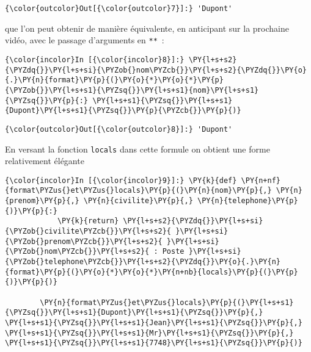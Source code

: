 \begin{Verbatim}[commandchars=\\\{\}]
{\color{outcolor}Out[{\color{outcolor}7}]:} 'Dupont'
\end{Verbatim}
            
    que l'on peut obtenir de manière équivalente, en anticipant sur la
prochaine vidéo, avec le passage d'arguments en \texttt{**}~:

    \begin{Verbatim}[commandchars=\\\{\}]
{\color{incolor}In [{\color{incolor}8}]:} \PY{l+s+s2}{\PYZdq{}}\PY{l+s+si}{\PYZob{}nom\PYZcb{}}\PY{l+s+s2}{\PYZdq{}}\PY{o}{.}\PY{n}{format}\PY{p}{(}\PY{o}{*}\PY{o}{*}\PY{p}{\PYZob{}}\PY{l+s+s1}{\PYZsq{}}\PY{l+s+s1}{nom}\PY{l+s+s1}{\PYZsq{}}\PY{p}{:} \PY{l+s+s1}{\PYZsq{}}\PY{l+s+s1}{Dupont}\PY{l+s+s1}{\PYZsq{}}\PY{p}{\PYZcb{}}\PY{p}{)}
\end{Verbatim}


\begin{Verbatim}[commandchars=\\\{\}]
{\color{outcolor}Out[{\color{outcolor}8}]:} 'Dupont'
\end{Verbatim}
            
    En versant la fonction \texttt{locals} dans cette formule on obtient une
forme relativement élégante

    \begin{Verbatim}[commandchars=\\\{\}]
{\color{incolor}In [{\color{incolor}9}]:} \PY{k}{def} \PY{n+nf}{format\PYZus{}et\PYZus{}locals}\PY{p}{(}\PY{n}{nom}\PY{p}{,} \PY{n}{prenom}\PY{p}{,} \PY{n}{civilite}\PY{p}{,} \PY{n}{telephone}\PY{p}{)}\PY{p}{:}
            \PY{k}{return} \PY{l+s+s2}{\PYZdq{}}\PY{l+s+si}{\PYZob{}civilite\PYZcb{}}\PY{l+s+s2}{ }\PY{l+s+si}{\PYZob{}prenom\PYZcb{}}\PY{l+s+s2}{ }\PY{l+s+si}{\PYZob{}nom\PYZcb{}}\PY{l+s+s2}{ : Poste }\PY{l+s+si}{\PYZob{}telephone\PYZcb{}}\PY{l+s+s2}{\PYZdq{}}\PY{o}{.}\PY{n}{format}\PY{p}{(}\PY{o}{*}\PY{o}{*}\PY{n+nb}{locals}\PY{p}{(}\PY{p}{)}\PY{p}{)}
        
        \PY{n}{format\PYZus{}et\PYZus{}locals}\PY{p}{(}\PY{l+s+s1}{\PYZsq{}}\PY{l+s+s1}{Dupont}\PY{l+s+s1}{\PYZsq{}}\PY{p}{,} \PY{l+s+s1}{\PYZsq{}}\PY{l+s+s1}{Jean}\PY{l+s+s1}{\PYZsq{}}\PY{p}{,} \PY{l+s+s1}{\PYZsq{}}\PY{l+s+s1}{Mr}\PY{l+s+s1}{\PYZsq{}}\PY{p}{,} \PY{l+s+s1}{\PYZsq{}}\PY{l+s+s1}{7748}\PY{l+s+s1}{\PYZsq{}}\PY{p}{)}
\end{Verbatim}


